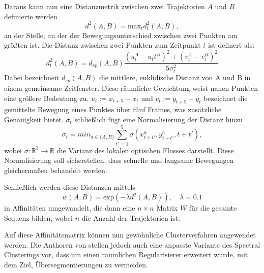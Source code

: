 Daraus kann nun eine Distanzmetrik zwischen zwei Trajektorien $A$ und $B$ definierte werden
\begin{equation}
  d^2(A,B) = \mathrm{max}_t d_t^2(A,B),
\end{equation}
an der Stelle, an der der Bewegungsunterschied zwischen zwei Punkten am größten ist. Die Distanz zwischen zwei Punkten zum Zeitpunkt $t$ ist definert als:
\begin{equation}
  d_t^2(A,B) = d_{sp}(A,B) \frac{(u_t^A - u_tt^B)^2 + (v_t^A - v_t^B)^2}{5\sigma_t^2}
\end{equation}
Dabei bezeichneit $d_{sp}(A,B)$ die mittlere, euklidische Distanz von A und B in einem gemeinsame Zeitfenster. Diese räumliche Gewichtung weist
nahen Punkten eine größere Bedeutung zu. $u_t := x_{t+5} - x_t$ und $v_t := y_{t+5} - y_t$ bezeichnet die gemittelte Bewegung eines Punktes über fünf Frames,
was zusätzliche Genauigkeit bietet. $\sigma_t$ schließlich fügt eine Normalisierung der Distanz hinzu
\begin{equation}
  \sigma_t = min_{a\in\{A,B\}} \sum \limits_{t'=1}^5 \sigma(x_{t+t'}^a,y_{t+t'}^a,t+t'),
\end{equation}
wobei $\sigma : \mathbb{R}^3 \rightarrow \mathbb{R}$ die Varianz des lokalen optischen Flusses darstellt. Diese Normalisierung soll sicherstellen, dass
schnelle und langsame Bewegungen gleichermaßen behandelt werden.

Schließlich werden diese Distanzen mittels
\begin{equation}
  w(A,B)= \mathrm{exp}(-\lambda d^2(A,B)), \quad \lambda = 0.1
\end{equation}
in Affinitäten umgewandelt, die dann eine $n \times n$ Matrix $W$ für die gesamte Sequenz bilden, wobei $n$ die Anzahl der Trajektorien ist.

Auf diese Affinitätsmatrix können nun gewöhnliche Clusterverfahren angewendet werden. Die Authoren von \cite{007} stellen jedoch auch
eine anpasste Variante des Spectral Clusterings vor, dass um einen räumlichen Regularisierer erweitert wurde, mit dem Ziel, Übersegmentierungen zu vermeiden.



